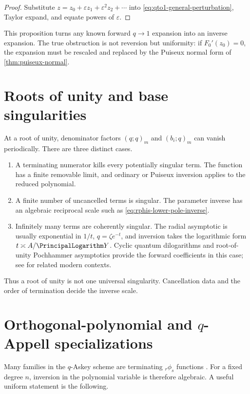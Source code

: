 \documentclass[11pt,a4paper,oneside,openany]{book}
\theoremstyle{definition}
\theoremstyle{remark}
\newcommand{\eps}{\varepsilon}
\begin{document}
\begin{proof}
Substitute \(z=z_0+\eps z_1+\eps^2z_2+\cdots\) into
\eqref{eq:qto1-general-perturbation}, Taylor expand, and equate powers of
\(\eps\).
\end{proof}

This proposition turns any known forward \(q\to1\) expansion into an inverse
expansion.  The true obstruction is not reversion but uniformity: if
\(F_0'(z_0)=0\), the expansion must be rescaled and replaced by the Puiseux
normal form of \cref{thm:puiseux-normal}.

\section{Roots of unity and base singularities}

At a root of unity, denominator factors \((q;q)_m\) and
\((b_i;q)_m\) can vanish periodically.  There are three distinct cases.

\begin{enumerate}[label=\textup{(\alph*)}]
\item A terminating numerator kills every potentially singular term.  The
function has a finite removable limit, and ordinary or Puiseux inversion
applies to the reduced polynomial.
\item A finite number of uncancelled terms is singular.  The parameter inverse
has an algebraic reciprocal scale such as \eqref{eq:rphis-lower-pole-inverse}.
\item Infinitely many terms are coherently singular.  The radial asymptotic is
usually exponential in \(1/t\), \(q=\zeta e^{-t}\), and inversion takes the
logarithmic form \(t\asymp A/\PrincipalLogarithm Y\).  Cyclic quantum dilogarithms and
root-of-unity Pochhammer asymptotics provide the forward coefficients in this
case; see \cite{Kopp2025,Fantini2025} for related modern contexts.
\end{enumerate}

Thus a root of unity is not one universal singularity.  Cancellation data and
the order of termination decide the inverse scale.

\section{Orthogonal-polynomial and \texorpdfstring{$q$}{q}-Appell specializations}

Many families in the \(q\)-Askey scheme are terminating
\({}_r\phi_s\) functions \cite{Ismail2005}.  For a fixed degree \(n\),
inversion in the polynomial variable is therefore algebraic.  A useful
uniform statement is the following.
\end{document}
